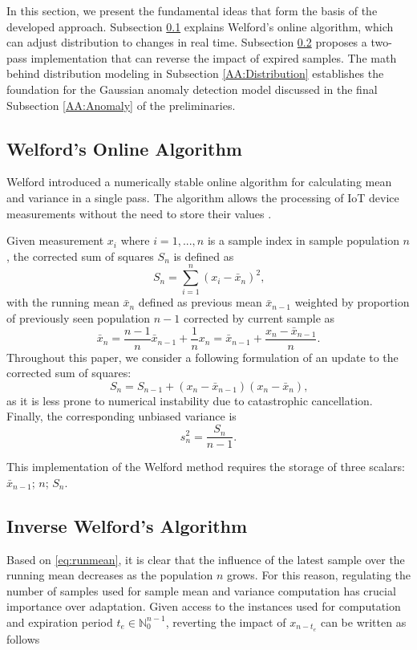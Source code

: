 In this section, we present the fundamental ideas that form the basis of the developed approach. Subsection \ref{AA:Welford} explains Welford's online algorithm, which can adjust distribution to changes in real time. Subsection \ref{AA:InvWelford} proposes a two-pass implementation that can reverse the impact of expired samples. The math behind distribution modeling in Subsection \ref{AA:Distribution} establishes the foundation for the Gaussian anomaly detection model discussed in the final Subsection \ref{AA:Anomaly} of the preliminaries.

\subsection{Welford's Online Algorithm}\label{AA:Welford}
Welford introduced a numerically stable online algorithm for calculating mean and variance in a single pass. The algorithm allows the processing of IoT device measurements without the need to store their values \cite{Wel62}.

Given measurement \(x_i\) where \(i=1,...,n\) is a sample index in sample population \(n\), the corrected sum of squares \(S_n\) is defined as
\begin{equation}
S_n = \sum_{i=1}^n (x_i - \bar x_n)^2\text{,}\label{eq:sumsquares}
\end{equation}
with the running mean \(\bar x_n\) defined as previous mean \(\bar x_{n-1}\) weighted by proportion of previously seen population \(n-1\) corrected by current sample as
\begin{equation}
\bar x_n = \frac{n-1}{n} \bar x_{n-1} + \frac{1}{n}x_n = \bar x_{n-1} + \frac{x_n - \bar x_{n-1}}{n}\text{.}\label{eq:runmean}
\end{equation}
Throughout this paper, we consider a following formulation of an update to the corrected sum of squares:
\begin{equation}
S_n = S_{n-1} + (x_n - \bar x_{n-1})(x_n - \bar x_n)\text{,}\label{eq:upsumsquares}
\end{equation}
as it is less prone to numerical instability due to catastrophic cancellation. Finally, the corresponding unbiased variance is
\begin{equation}
s^2_n = \frac{S_{n}}{n-1}\text{.}\label{eq:runvar}
\end{equation}

This implementation of the Welford method requires the storage of three scalars: \(\bar x_{n-1}\); \(n\); \(S_n\).

\subsection{Inverse Welford's Algorithm}\label{AA:InvWelford}
Based on \eqref{eq:runmean}, it is clear that the influence of the latest sample over the running mean decreases as the population \(n\) grows. For this reason, regulating the number of samples used for sample mean and variance computation has crucial importance over adaptation. Given access to the instances used for computation and expiration period \(t_e \in \mathbb{N}_{0}^{n-1}\), reverting the impact of \(x_{n-t_e}\) can be written as follows

